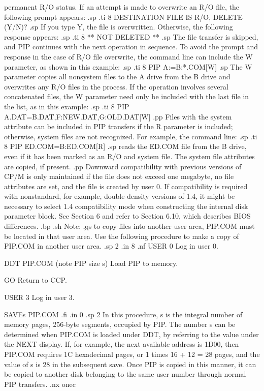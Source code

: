 $$permanent R/O status.  If an attempt is made to overwrite an R/O file, the
following prompt appears:
.sp
.ti 8
DESTINATION FILE IS R/O, DELETE (Y/N)?
.sp
If you type Y, the file is overwritten.  Otherwise, the following response
appears:
.sp
.ti 8
** NOT DELETED **
.sp
The file transfer is skipped, and PIP continues with the next
operation in sequence.  To avoid the prompt and response in the case of R/O
file overwrite, the command line can include the W parameter, as 
shown in this example:
.sp
.ti 8
PIP A:=B:*.COM[W]
.sp
The W parameter copies all nonsystem files to the A drive from the B drive and
overwrites any R/O files in the process.  If the operation involves several
concatenated files, the W parameter need only be included with the last file
in the list, as in this example:
.sp
.ti 8
PIP A.DAT=B.DAT,F:NEW.DAT,G:OLD.DAT[W]
.pp
Files with the system attribute can be included in PIP transfers if the R
parameter is included; otherwise, system files are not 
recognized.  For example, the command line:
.sp
.ti 8
PIP ED.COM=B:ED.COM[R]
.sp
reads the ED.COM file from the B drive, even if it has been
marked as an R/O and system file.  The system file attributes are copied, if
present.
.pp
Downward compatibility with previous versions of CP/M is only maintained if
the file does not exceed one megabyte, no file attributes are set, and the
file is created by user 0.  If compatibility is required with 
nonstandard, for example, double-density versions of 1.4, it 
might be
necessary to select 1.4
compatibility mode when constructing the internal disk parameter block.  See
Section 6 and refer to Section 6.10, which describes BIOS differences.
.bp
.sh
Note:  \c
.qs
to copy files into another user area, PIP.COM must be located in that user
area.  Use the following procedure to make a copy of PIP.COM in another
user area.
.sp 2
.in 8
.nf
USER 0                            Log in user 0.

DDT PIP.COM (note PIP size s)     Load PIP to memory.

GO                                Return to CCP.

USER 3                            Log in user 3.

SAVEs PIP.COM
.fi
.in 0
.sp 2
In this procedure, s is the integral number of memory pages, 256-byte 
segments, occupied
by PIP.  The number s can be determined when PIP.COM is loaded under DDT,
by referring to the value under the NEXT display.  If, for example, the next
available address is 1D00, then PIP.COM requires 1C hexadecimal 
pages, or
1 times 16 + 12 = 28 pages, and the value of s is 28 in the subsequent
save.  Once PIP is copied in this manner, it can be copied to another disk
belonging to the same user number through normal PIP transfers.
.nx onec
